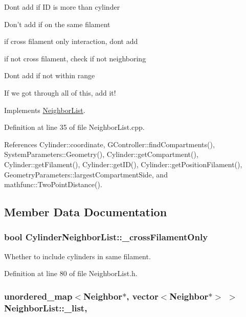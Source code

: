 Dont add if I\+D is more than cylinder

Don't add if on the same filament

if cross filament only interaction, dont add

if not cross filament, check if not neighboring

Dont add if not within range

If we got through all of this, add it! 

Implements \hyperlink{classNeighborList_a843e9dcb6dd245e183252c1b5e538877}{Neighbor\+List}.



Definition at line 35 of file Neighbor\+List.\+cpp.



References Cylinder\+::coordinate, G\+Controller\+::find\+Compartments(), System\+Parameters\+::\+Geometry(), Cylinder\+::get\+Compartment(), Cylinder\+::get\+Filament(), Cylinder\+::get\+I\+D(), Cylinder\+::get\+Position\+Filament(), Geometry\+Parameters\+::largest\+Compartment\+Side, and mathfunc\+::\+Two\+Point\+Distance().



\subsection{Member Data Documentation}
\hypertarget{classCylinderNeighborList_aa43a77d156819bcfdef9285eeab98d92}{
\subsubsection[{\+\_\+cross\+Filament\+Only}]{\setlength{\rightskip}{0pt plus 5cm}bool Cylinder\+Neighbor\+List\+::\+\_\+cross\+Filament\+Only\hspace{0.3cm}{\ttfamily [private]}}}\label{classCylinderNeighborList_aa43a77d156819bcfdef9285eeab98d92}


Whether to include cylinders in same filament. 



Definition at line 80 of file Neighbor\+List.\+h.

\hypertarget{classNeighborList_af09da5281bc352cf028e39276ba5b68f}{
\subsubsection[{\+\_\+list}]{\setlength{\rightskip}{0pt plus 5cm}unordered\+\_\+map$<${\bf Neighbor}$\ast$, vector$<${\bf Neighbor}$\ast$$>$ $>$ Neighbor\+List\+::\+\_\+list\hspace{0.3cm}{\ttfamily [protected]}, {\ttfamily [inherited]}}}\label{classNeighborList_af09da5281bc352cf028e39276ba5b68f}


